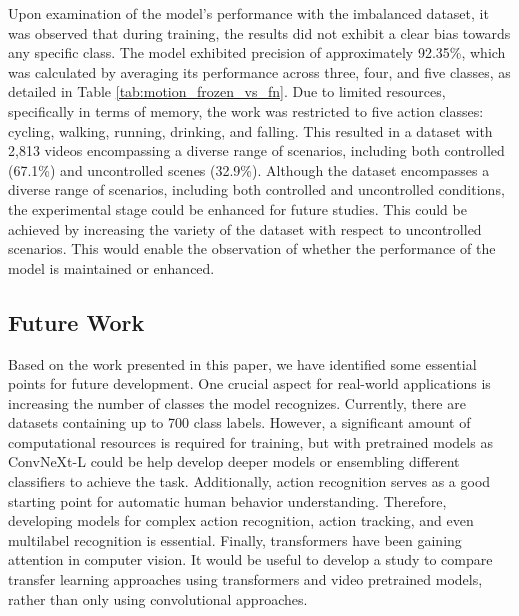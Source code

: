 \documentclass[mathematics,article,submit,pdftex,moreauthors]{Definitions/mdpi}
\begin{document}
Upon examination of the model's performance with the imbalanced dataset, it was observed that during training, the results did not exhibit a clear bias towards any specific class. 
The model exhibited precision of approximately 92.35\%, which was calculated by averaging its performance across three, four, and five classes, as detailed in Table \ref{tab:motion_frozen_vs_fn}. 
Due to limited resources, specifically in terms of memory, the work was restricted to five action classes: cycling, walking, running, drinking, and falling. This resulted in a dataset with 2,813 videos encompassing a diverse range of scenarios, including both controlled (67.1\%) and uncontrolled scenes (32.9\%). Although the dataset encompasses a diverse range of scenarios, including both controlled and uncontrolled conditions, the experimental stage could be enhanced for future studies. This could be achieved by increasing the variety of the dataset with respect to uncontrolled scenarios. This would enable the observation of whether the performance of the model is maintained or enhanced.

\subsection{Future Work}
Based on the work presented in this paper, we have identified some essential points for future development. One crucial aspect for real-world applications is increasing the number of classes the model recognizes. Currently, there are datasets containing up to 700 class labels. However, a significant amount of computational resources is required for training, but with pretrained models as ConvNeXt-L could be help develop deeper models or ensembling different classifiers to achieve the task. Additionally, action recognition serves as a good starting point for automatic human behavior understanding. Therefore, developing models for complex action recognition, action tracking, and even multilabel recognition is essential. Finally, transformers have been gaining attention in computer vision. It would be useful to develop a study to compare transfer learning approaches using transformers and video pretrained models, rather than only using convolutional approaches. 

\end{document}
